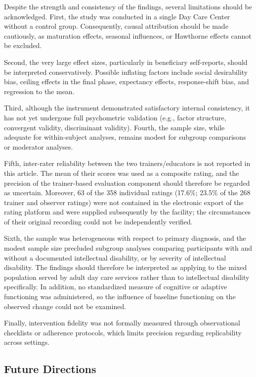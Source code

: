 \documentclass[12pt,a4paper]{article}
\begin{document}
Despite the strength and consistency of the findings, several limitations should be acknowledged. First, the study was conducted in a single Day Care Center without a control group. Consequently, causal attribution should be made cautiously, as maturation effects, seasonal influences, or Hawthorne effects cannot be excluded.

Second, the very large effect sizes, particularly in beneficiary self-reports, should be interpreted conservatively. Possible inflating factors include social desirability bias, ceiling effects in the final phase, expectancy effects, response-shift bias, and regression to the mean.

Third, although the instrument demonstrated satisfactory internal consistency, it has not yet undergone full psychometric validation (e.g., factor structure, convergent validity, discriminant validity). Fourth, the sample size, while adequate for within-subject analyses, remains modest for subgroup comparisons or moderator analyses.

Fifth, inter-rater reliability between the two trainers/educators is not reported in this article. The mean of their scores was used as a composite rating, and the precision of the trainer-based evaluation component should therefore be regarded as uncertain. Moreover, 63 of the 358 individual ratings (17.6\%; 23.5\% of the 268 trainer and observer ratings) were not contained in the electronic export of the rating platform and were supplied subsequently by the facility; the circumstances of their original recording could not be independently verified.

Sixth, the sample was heterogeneous with respect to primary diagnosis, and the modest sample size precluded subgroup analyses comparing participants with and without a documented intellectual disability, or by severity of intellectual disability. The findings should therefore be interpreted as applying to the mixed population served by adult day care services rather than to intellectual disability specifically. In addition, no standardized measure of cognitive or adaptive functioning was administered, so the influence of baseline functioning on the observed change could not be examined.

Finally, intervention fidelity was not formally measured through observational checklists or adherence protocols, which limits precision regarding replicability across settings.

\subsection{Future Directions}
\end{document}
